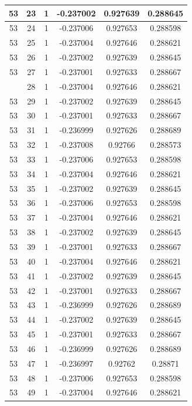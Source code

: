 \documentclass[12pt,a4paper]{article}
\numberwithin{equation}{section}
\numberwithin{figure}{section}
\numberwithin{table}{section}
\begin{document}
\begin{longtable}{|c|c|c|c|c|c|}
53 & 23 & 1 & -0.237002 & 0.927639 & 0.288645 \\ \hline
53 & 24 & 1 & -0.237006 & 0.927653 & 0.288598 \\ \hline
53 & 25 & 1 & -0.237004 & 0.927646 & 0.288621 \\ \hline
53 & 26 & 1 & -0.237002 & 0.927639 & 0.288645 \\ \hline
53 & 27 & 1 & -0.237001 & 0.927633 & 0.288667 \\ \hline
\pagebreak
53 & 28 & 1 & -0.237004 & 0.927646 & 0.288621 \\ \hline
53 & 29 & 1 & -0.237002 & 0.927639 & 0.288645 \\ \hline
53 & 30 & 1 & -0.237001 & 0.927633 & 0.288667 \\ \hline
53 & 31 & 1 & -0.236999 & 0.927626 & 0.288689 \\ \hline
53 & 32 & 1 & -0.237008 & 0.92766 & 0.288573 \\ \hline
53 & 33 & 1 & -0.237006 & 0.927653 & 0.288598 \\ \hline
53 & 34 & 1 & -0.237004 & 0.927646 & 0.288621 \\ \hline
53 & 35 & 1 & -0.237002 & 0.927639 & 0.288645 \\ \hline
53 & 36 & 1 & -0.237006 & 0.927653 & 0.288598 \\ \hline
53 & 37 & 1 & -0.237004 & 0.927646 & 0.288621 \\ \hline
53 & 38 & 1 & -0.237002 & 0.927639 & 0.288645 \\ \hline
53 & 39 & 1 & -0.237001 & 0.927633 & 0.288667 \\ \hline
53 & 40 & 1 & -0.237004 & 0.927646 & 0.288621 \\ \hline
53 & 41 & 1 & -0.237002 & 0.927639 & 0.288645 \\ \hline
53 & 42 & 1 & -0.237001 & 0.927633 & 0.288667 \\ \hline
53 & 43 & 1 & -0.236999 & 0.927626 & 0.288689 \\ \hline
53 & 44 & 1 & -0.237002 & 0.927639 & 0.288645 \\ \hline
53 & 45 & 1 & -0.237001 & 0.927633 & 0.288667 \\ \hline
53 & 46 & 1 & -0.236999 & 0.927626 & 0.288689 \\ \hline
53 & 47 & 1 & -0.236997 & 0.92762 & 0.28871 \\ \hline
53 & 48 & 1 & -0.237006 & 0.927653 & 0.288598 \\ \hline
53 & 49 & 1 & -0.237004 & 0.927646 & 0.288621 \\ \hline

\end{longtable}
\end{document}
